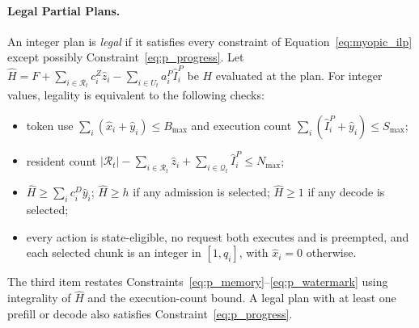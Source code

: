 \documentclass[11pt]{article}
\begin{document}
\paragraph{Legal Partial Plans.}
An integer plan is \emph{legal} if it satisfies every constraint of Equation~\ref{eq:myopic_ilp} except possibly Constraint~\ref{eq:p_progress}. Let \(\hat H=F+\sum_{i\in\mathcal{R}_t}c_i^Z\hat z_i-\sum_{i\in U_t}a_i^P\hat I_i^P\) be \(H\) evaluated at the plan. For integer values, legality is equivalent to the following checks:
\begin{itemize}
    \item token use \(\sum_i(\hat x_i+\hat y_i)\le B_{\max}\) and execution count \(\sum_i(\hat I_i^P+\hat y_i)\le S_{\max}\);
    \item resident count \(|\mathcal{R}_t|-\sum_{i\in\mathcal{R}_t}\hat z_i+\sum_{i\in\mathcal{Q}_t}\hat I_i^P\le N_{\max}\);
    \item \(\hat H\ge\sum_i c_i^D\hat y_i\); \(\hat H\ge h\) if any admission is selected; \(\hat H\ge1\) if any decode is selected;
    \item every action is state-eligible, no request both executes and is preempted, and each selected chunk is an integer in \([1,q_i]\), with \(\hat x_i=0\) otherwise.
\end{itemize}
The third item restates Constraints~\ref{eq:p_memory}--\ref{eq:p_watermark} using integrality of \(\hat H\) and the execution-count bound. A legal plan with at least one prefill or decode also satisfies Constraint~\ref{eq:p_progress}.
\end{document}
